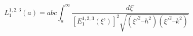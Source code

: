 \documentclass{jfm}
\begin{document}
\begin{equation}
L_1^{1,2,3}(a) = abc \int_a^{\infty} \frac{ d \xi’}{ \left[ E_1^{1,2,3}(\xi’) \right]^2 \sqrt{\left( \xi'^{2} – h^2 \right) \left( \xi'^{2} – k^2\right)} }
\end{equation}




\end{document}
